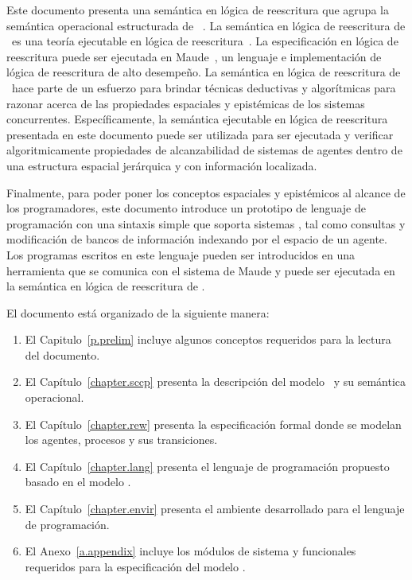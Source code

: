 Este documento presenta una sem\'antica en l\'ogica de reescritura que agrupa la sem\'antica operacional estructurada de \SCCP~\cite{knight:hal-00761116}. La sem\'antica en l\'ogica de reescritura de \SCCP \ es una teor\'ia ejecutable en l\'ogica de reescritura~\cite{Meseguer199273}. La especificaci\'on en l\'ogica de reescritura puede ser ejecutada en Maude~\cite{maude-book}, un lenguaje e implementaci\'on de l\'ogica de reescritura de alto desempe\~no. La sem\'antica en l\'ogica de reescritura de \SCCP \ hace parte de un esfuerzo para brindar t\'ecnicas deductivas y algor\'itmicas para razonar acerca de las propiedades espaciales y epist\'emicas de los sistemas concurrentes. Espec\'ificamente, la sem\'antica ejecutable en l\'ogica de reescritura presentada en este documento puede ser utilizada para ser ejecutada y verificar algoritmicamente propiedades de alcanzabilidad de sistemas de agentes dentro de una estructura espacial jer\'arquica y con informaci\'on localizada.

Finalmente, para poder poner los conceptos espaciales y epist\'emicos al alcance de los programadores, este documento introduce un prototipo de lenguaje de programaci\'on con una sintaxis simple que soporta sistemas \SCCP, tal como consultas y modificaci\'on de bancos de informaci\'on indexando por el espacio de un agente. Los programas escritos en este lenguaje pueden ser introducidos en una herramienta que se comunica con el sistema de Maude y puede ser ejecutada en la sem\'antica en l\'ogica de reescritura de \SCCP.

El documento est\'a organizado de la siguiente manera:
\begin{enumerate}
\item El Capitulo~\ref{p.prelim} incluye algunos conceptos requeridos para la lectura del documento.
\item El Cap\'itulo~\ref{chapter.sccp} presenta la descripci\'on del modelo \SCCP \ y su sem\'antica operacional.
\item El Cap\'itulo~\ref{chapter.rew} presenta la especificaci\'on formal donde se modelan los agentes, procesos y sus transiciones. 
\item El Cap\'itulo~\ref{chapter.lang} presenta el lenguaje de programaci\'on propuesto basado en el modelo \SCCP.
\item El Cap\'itulo~\ref{chapter.envir} presenta el ambiente desarrollado para el lenguaje de programaci\'on.
\item El Anexo~\ref{a.appendix} incluye los m\'odulos de sistema y funcionales requeridos para la especificaci\'on del modelo \SCCP.
\end{enumerate}
